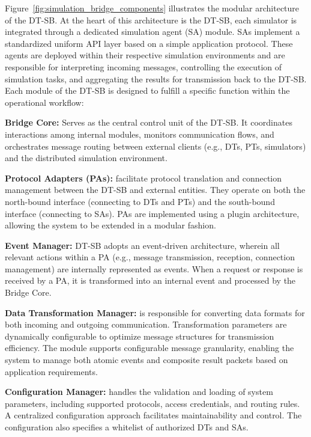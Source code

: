 Figure~\ref{fig:simulation_bridge_components} illustrates the modular architecture of the DT-SB. 
At the heart of this architecture is the DT-SB, each simulator is integrated through a dedicated simulation agent (SA) module.
SAs implement a standardized uniform API layer based on a simple application protocol. 
These agents are deployed within their respective simulation environments and are responsible for interpreting incoming messages, controlling the execution of simulation tasks, and aggregating the results for transmission back to the DT-SB.
%
Each module of the DT-SB is designed to fulfill a specific function within the operational workflow:

\noindent\textbf{Bridge Core:}  
Serves as the central control unit of the DT-SB. It coordinates interactions among internal modules, monitors communication flows, and orchestrates message routing between external clients (e.g., DTs, PTs, simulators) and the distributed simulation environment.

\noindent\textbf{Protocol Adapters (PAs):}  
facilitate protocol translation and connection management between the DT-SB and external entities. They operate on both the north-bound interface (connecting to DTs and PTs) and the south-bound interface (connecting to SAs). PAs are implemented using a plugin architecture, allowing the system to be extended in a modular fashion.

\noindent\textbf{Event Manager:}  
DT-SB adopts an event-driven architecture, wherein all relevant actions within a PA (e.g., message transmission, reception, connection management) are internally represented as events. When a request or response is received by a PA, it is transformed into an internal event and processed by the Bridge Core.

\noindent\textbf{Data Transformation Manager:} 
is responsible for converting data formats for both incoming and outgoing communication. Transformation parameters are dynamically configurable to optimize message structures for transmission efficiency. The module supports configurable message granularity, enabling the system to manage both atomic events and composite result packets based on application requirements.

\noindent\textbf{Configuration Manager:}  
handles the validation and loading of system parameters, including supported protocols, access credentials, and routing rules. A centralized configuration approach facilitates maintainability and control. The configuration also specifies a whitelist of authorized DTs and SAs.

